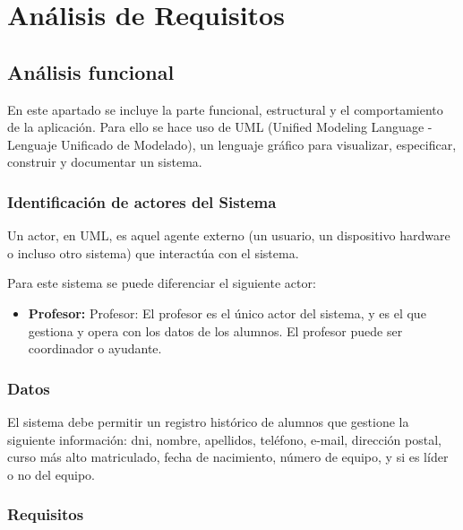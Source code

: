 \chapter{Análisis de Requisitos}
\section{Análisis funcional}
En este apartado se incluye la parte funcional, estructural y el comportamiento de la aplicación. Para ello se hace uso de UML (Unified Modeling Language - Lenguaje Unificado de Modelado), un lenguaje gráfico para visualizar, especificar, construir y documentar un sistema.
\subsection{Identificación de actores del Sistema}
Un actor, en UML, es aquel agente externo (un usuario, un dispositivo hardware o incluso
otro sistema) que interactúa con el sistema.

Para este sistema se puede diferenciar el siguiente actor:
\begin{itemize}
	\item \textbf{Profesor:} Profesor: El profesor es el único actor del sistema, y es el que gestiona y opera con los datos de los alumnos. El profesor puede ser coordinador o ayudante.
\end{itemize}

\subsection{Datos}
El sistema debe permitir un registro histórico de alumnos que gestione la siguiente información: dni, nombre, apellidos, teléfono, e-mail, dirección postal, curso más alto matriculado, fecha de nacimiento, número de equipo, y si es líder o no del equipo.

\subsection{Requisitos}
